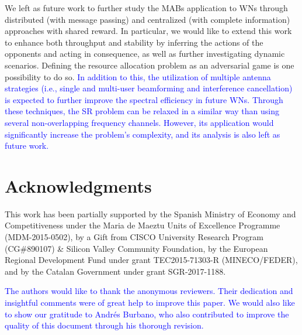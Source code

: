 \documentclass[preprint,12pt]{elsarticle}
\begin{document}
	We left as future work to further study the MABs application to WNs through distributed (with message passing) and centralized (with complete information) approaches with shared reward. In particular, we would like to extend this work to enhance both throughput and stability by inferring the actions of the opponents and acting in consequence, as well as further investigating dynamic scenarios. Defining the resource allocation problem as an adversarial game is one possibility to do so. \textcolor{blue}{In addition to this, the utilization of multiple antenna strategies (i.e., single and multi-user beamforming and interference cancellation) is expected to further improve the spectral efficiency in future WNs. Through these techniques, the SR problem can be relaxed in a similar way than using several non-overlapping frequency channels. However, its application would significantly increase the problem's complexity, and its analysis is also left as future work.}
	
	\section*{Acknowledgments}
	This work has been partially supported by the Spanish Ministry of Economy and Competitiveness under the Maria de Maeztu Units of Excellence Programme (MDM-2015-0502), by a Gift from CISCO University Research Program (CG\#890107) \& Silicon Valley Community Foundation, by the European Regional Development Fund under grant TEC2015-71303-R (MINECO/FEDER), and by the Catalan Government under grant SGR-2017-1188.
	
	\textcolor{blue}{The authors would like to thank the anonymous reviewers. Their dedication and insightful comments were of great help to improve this paper. 
		We would also like to show our gratitude to Andrés Burbano, who also contributed to improve the quality of this document through his thorough revision.
	}
	
	\newpage
	
	
	
\end{document}
